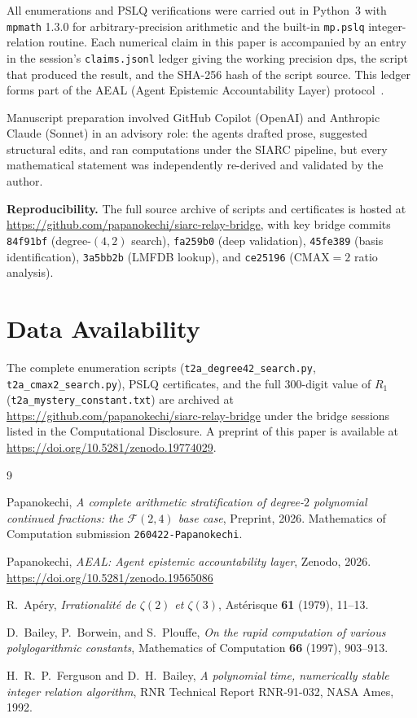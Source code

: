 \documentclass[11pt,a4paper]{amsart}
\theoremstyle{definition}
\theoremstyle{remark}
\newcommand{\FF}{\mathcal{F}}
\newcommand{\dps}{\mathrm{dps}}
\begin{document}
All enumerations and PSLQ verifications were carried out in Python~3
with \texttt{mpmath} 1.3.0 for arbitrary-precision arithmetic and
the built-in \texttt{mp.pslq} integer-relation routine.  Each
numerical claim in this paper is accompanied by an entry in the
session's \texttt{claims.jsonl} ledger giving the working precision
$\dps$, the script that produced the result, and the SHA-256 hash of
the script source.  This ledger forms part of the AEAL (Agent
Epistemic Accountability Layer) protocol~\cite{aeal}.

Manuscript preparation involved GitHub Copilot (OpenAI) and
Anthropic Claude (Sonnet) in an advisory role: the agents drafted
prose, suggested structural edits, and ran computations under the
SIARC pipeline, but every mathematical statement was independently
re-derived and validated by the author.

\bigskip
\noindent\textbf{Reproducibility.}
The full source archive of scripts and certificates is hosted at
\url{https://github.com/papanokechi/siarc-relay-bridge}, with key
bridge commits \texttt{84f91bf} (degree-$(4,2)$ search),
\texttt{fa259b0} (deep validation), \texttt{45fe389} (basis
identification), \texttt{3a5bb2b} (LMFDB lookup), and
\texttt{ce25196} (CMAX$=2$ ratio analysis).

\section*{Data Availability}\label{sec:data}
The complete enumeration scripts (\texttt{t2a\_degree42\_search.py},
\texttt{t2a\_cmax2\_search.py}), PSLQ certificates, and the
full $300$-digit value of $R_1$ (\texttt{t2a\_mystery\_constant.txt})
are archived at
\url{https://github.com/papanokechi/siarc-relay-bridge}
under the bridge sessions listed in the Computational Disclosure.
A preprint of this paper is available at
\url{https://doi.org/10.5281/zenodo.19774029}.

\begin{thebibliography}{9}

Papanokechi, \emph{A complete arithmetic stratification of degree-$2$
polynomial continued fractions: the $\FF(2,4)$ base case}, Preprint,
2026.  Mathematics of Computation submission \texttt{260422-Papanokechi}.

Papanokechi, \emph{AEAL: Agent epistemic accountability layer},
Zenodo, 2026.\\
\url{https://doi.org/10.5281/zenodo.19565086}

R.~Ap\'ery, \emph{Irrationalit\'e de $\zeta(2)$ et $\zeta(3)$},
Ast\'erisque \textbf{61} (1979), 11--13.

D.~Bailey, P.~Borwein, and S.~Plouffe, \emph{On the rapid computation
of various polylogarithmic constants}, Mathematics of Computation
\textbf{66} (1997), 903--913.

H.~R.~P.~Ferguson and D.~H.~Bailey, \emph{A polynomial time,
numerically stable integer relation algorithm}, RNR Technical Report
RNR-91-032, NASA Ames, 1992.

\end{thebibliography}
\end{document}
